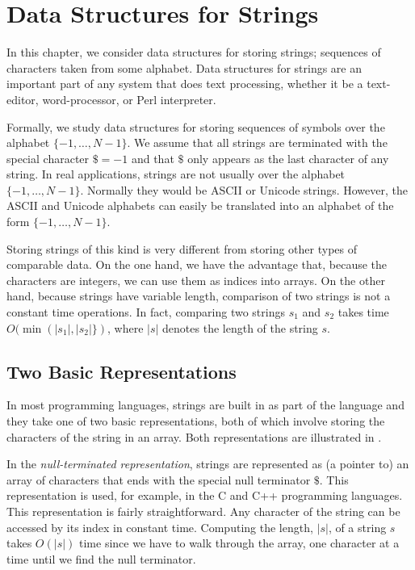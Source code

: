 \chapter{Data Structures for Strings}


In this chapter, we consider data structures for storing strings;
sequences of characters taken from some alphabet.  Data structures for
strings are an important part of any system that does text processing,
whether it be a text-editor, word-processor, or Perl interpreter.

Formally, we study data structures for storing sequences of symbols
over the alphabet $\{-1,\ldots,N-1\}$.  We assume that all strings are
terminated with the special character $\$=-1$ and that $\$$ only
appears as the last character of any string.  In real applications,
strings are not usually over the alphabet $\{-1,\ldots,N-1\}$.
Normally they would be ASCII or Unicode strings.  However, the ASCII
and Unicode alphabets can easily be translated into an alphabet of 
the form $\{-1,\ldots,N-1\}$.

Storing strings of this kind is very different from storing other
types of comparable data.  On the one hand, we have the advantage
that, because the characters are integers, we can use them as indices
into arrays. On the other hand, because strings have variable length,
comparison of two strings is not a constant time operations.  In fact,
comparing two strings $s_1$ and $s_2$ takes time
$O(\min(|s_1|,|s_2|\})$, where $|s|$ denotes the length of the string
$s$.

\section{Two Basic Representations}

In most programming languages, strings are built in as part of the language
and they take one of two basic representations, both of which involve storing  the characters of the string in an array.  Both representations are illustrated in .

In the \emph{null-terminated representation}, strings are represented
as (a pointer to) an array of characters that ends with the special
null terminator $\$$.  This representation is used, for example, in the
C and C++  programming languages.  This representation is fairly straightforward.  Any character of the string can be accessed by its index in constant time.  Computing the length, $|s|$, of a string $s$ takes $O(|s|)$ time since we have to walk through the array, one character at a time until we find the null terminator.


